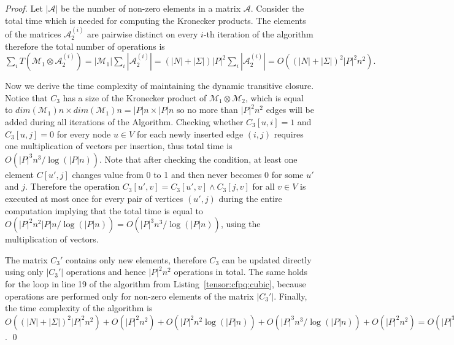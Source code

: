 \begin{proof}
 Let $|\mathcal{A}|$ be the number of non-zero elements in a matrix $\mathcal{A}$. Consider the total time which is needed for computing the Kronecker products. The elements of the matrices $\mathcal{A}_2^{(i)}$ are pairwise distinct on every $i$-th iteration of the algorithm therefore the total number of operations is $\sum\limits_i{T(\mathcal{M}_1 \otimes \mathcal{A}_2^{(i)})} = |\mathcal{M}_1| \sum\limits_i {|\mathcal{A}_2^{(i)}|} = (|N| + |\Sigma|){|P|}^2 \sum\limits_i {|\mathcal{A}_2^{(i)}|} = O({(|N| + |\Sigma|)}^2{|P|}^2 n^2).$


Now we derive the time complexity of maintaining the dynamic transitive closure.
Notice that $C_3$ has a size of the Kronecker product of $\mathcal{M}_1 \otimes \mathcal{M}_2$, which is equal to $dim(\mathcal{M}_1)n \times dim(\mathcal{M}_1)n = |P|n \times |P|n$ so no more than ${|P|}^2n^2$ edges will be added during all iterations of the Algorithm.
Checking whether $C_3[u, i] = 1$ and $C_3[u, j]=0$ for every node $u \in V$ for each newly inserted edge $(i, j)$ requires one multiplication of vectors per insertion, thus total time is $O({|P|}^3n^3/\log (|P|n))$.
Note that after checking the condition, at least one element $C[u', j]$ changes value from 0 to 1 and then never becomes 0 for some $u'$ and $j$.
Therefore the operation $C_3[u',v] = C_3[u', v] \wedge C_3[j, v]$ for all $v \in V$ is executed at most once for every pair of vertices $(u',j)$ during the entire computation implying that the total time is equal to $O({|P|}^2n^2|P|n/\log (|P|n))=O({|P|}^3n^3/\log (|P|n))$, using the  multiplication of vectors.


The matrix $C_3'$ contains only new elements, therefore $C_3$ can be updated directly using only $|C_3'|$ operations and hence ${|P|}^2n^2$ operations in total.
The same holds for the loop in line 19 of the algorithm from Listing~\ref{tensor:cfpq:cubic}, because operations are performed only for non-zero elements of the matrix $|C_3'|$.
Finally, the time complexity of the algorithm is $O({(|N| + |\Sigma|)}^2{|P|}^2 n^2) + O({|P|}^2n^2) + O({|P|}^2n^2 \log (|P|n)) + O({|P|}^3n^3/\log (|P|n)) + O({|P|}^2n^2)= O({|P|}^3n^3/\log (|P|n))$. \qed
\end{proof}


